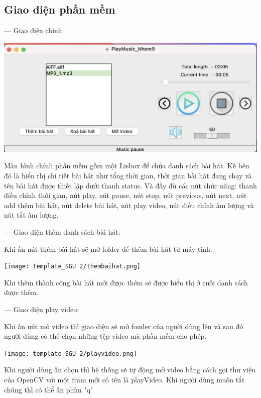 \documentclass[a4paper]{article}
\begin{document}
\subsection{Giao diện phần mềm}
\noindent --- Giao diện chính:

\begin{center}
\includegraphics[width=1\linewidth]{template_SGU 2/giaodien.png}
\end{center}
\hspace*{0.5cm} Màn hình chính phần mềm gồm một Lisbox để chứa danh sách bài hát. Kế bên đó là hiển thị chi tiết bài hát như tổng thời gian, thời gian bài hát đang chạy và tên bài hát được thiết lập dưới thanh status. Và đầy đủ các nút chức năng: thanh điều chỉnh thời gian, nút play, nút pause, nút stop, nút previous, nút next, nút add thêm bài hát, nút delete bài hát, nút play video, nút điều chỉnh âm lượng và nút tắt âm lượng.

\noindent --- Giao diện thêm danh sách bài hát:

\hspace  Khi ấn nút thêm bài hát sẽ mở folder để thêm bài hát từ máy tính.
\begin{center}
\texttt{[image: template\_SGU 2/thembaihat.png]}
\end{center} 
\newpage
\hspace  Khi thêm thành công bài hát mới được thêm sẽ được hiển thị ở cuối danh sách được thêm.

\noindent --- Giao diện play video:

\hspace Khi ấn nút mở video thì giao diện sẽ mở fouder của người dùng lên và sau đó người dùng có thể chọn những tệp video mà phần mềm cho phép.
\begin{center}
\texttt{[image: template\_SGU 2/playvideo.png]}
\end{center} 
\hspace  Khi người dùng ấn chọn thì hệ thống sẽ tự động mở video bằng cách gọi thư viện của OpenCV với một fram mới có tên là playVideo. Khi người dùng muốn tắt chúng thì có thể ấn phím "q"
\newpage
\end{document}
